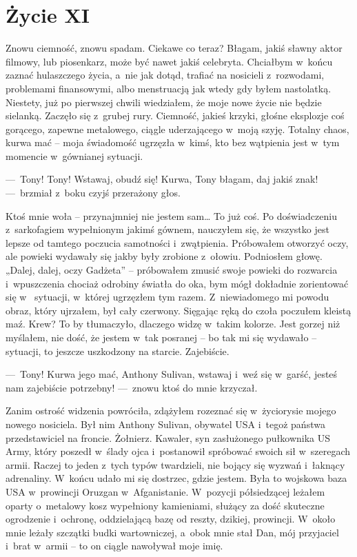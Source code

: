 \chapter{Życie XI}

Znowu ciemność, znowu spadam. Ciekawe co teraz? Błagam, jakiś sławny aktor filmowy, lub piosenkarz, może być nawet 
jakiś celebryta. Chciałbym w~końcu zaznać hulaszczego życia, a~nie jak dotąd, trafiać na nosicieli z~rozwodami, 
problemami finansowymi, albo menstruacją jak wtedy gdy byłem nastolatką. Niestety, już po pierwszej chwili 
wiedziałem, że moje nowe życie nie będzie sielanką. Zaczęło się z~grubej rury. Ciemność, jakieś krzyki, głośne 
eksplozje coś gorącego,  zapewne metalowego, ciągle uderzającego w~moją szyję. Totalny chaos, kurwa mać -- moja 
świadomość ugrzęzła w~kimś, kto bez wątpienia jest w~tym momencie w~gównianej sytuacji.  

---~Tony! Tony! Wstawaj, obudź się! Kurwa, Tony błagam, daj jakiś znak! ---~brzmiał z~boku czyjś przerażony głos. 

Ktoś mnie woła -- przynajmniej nie jestem sam… To już coś. Po doświadczeniu z~sarkofagiem wypełnionym jakimś gównem, 
nauczyłem się, że wszystko jest lepsze od tamtego poczucia samotności i~zwątpienia. Próbowałem otworzyć oczy, ale 
powieki wydawały się jakby były zrobione z~ołowiu. Podniosłem głowę. „Dalej, dalej, oczy Gadżeta” -- próbowałem 
zmusić swoje powieki do rozwarcia i~wpuszczenia chociaż odrobiny światła do oka, bym mógł dokładnie zorientować się w~
sytuacji, w~której ugrzęzłem tym razem. Z~niewiadomego mi powodu obraz, który ujrzałem, był cały czerwony. Sięgając 
ręką do czoła poczułem kleistą maź. Krew? To by tłumaczyło, dlaczego widzę w~takim kolorze. Jest gorzej niż myślałem, 
nie dość, że jestem w~tak posranej -- bo tak mi się wydawało -- sytuacji, to jeszcze uszkodzony na starcie. 
Zajebiście. 

---~Tony! Kurwa jego mać, Anthony Sulivan, wstawaj i~weź się w~garść, jesteś nam zajebiście potrzebny! ---~znowu ktoś 
do mnie krzyczał.

Zanim ostrość widzenia powróciła, zdążyłem rozeznać się w~życiorysie mojego nowego nosiciela. Był nim Anthony 
Sulivan, obywatel USA i~tegoż państwa przedstawiciel na froncie. Żołnierz. Kawaler, syn zasłużonego pułkownika US 
Army, który poszedł w~ślady ojca i~postanowił spróbować swoich sił w~szeregach armii. Raczej to jeden z~tych typów 
twardzieli, nie bojący się wyzwań i~łaknący adrenaliny. W~końcu udało mi się dostrzec, gdzie jestem. Była to wojskowa 
baza USA w~prowincji Oruzgan w~Afganistanie. W~pozycji półsiedzącej leżałem oparty o~metalowy kosz wypełniony 
kamieniami, służący za dość skuteczne ogrodzenie i~ochronę, oddzielającą bazę od reszty, dzikiej, prowincji. W~około 
mnie leżały szczątki budki wartowniczej, a~obok mnie stał Dan, mój przyjaciel i~brat w~armii -- to on ciągle 
nawoływał moje imię.


